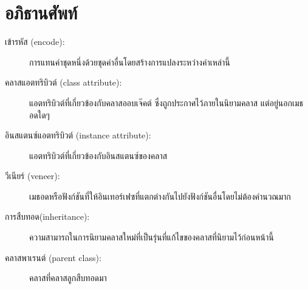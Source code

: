 \section{อภิธานศัพท์}

\begin{description}


\item[เข้ารหัส (encode):] การแทนค่าชุดหนึ่งด้วยชุดค่าอื่นโดยสร้างการแปลงระหว่างค่าเหล่านี้


\item[คลาสแอตทริบิวต์ (class attribute):] แอตทริบิวต์ที่เกี่ยวข้องกับคลาสออบเจ๊คต์ ซึ่งถูกประกาศไว้ภายในนิยามคลาส แต่อยู่นอกเมธอดใดๆ


\item[อินสแตนซ์แอตทริบิวต์ (instance attribute):] แอตทริบิวต์ที่เกี่ยวข้องกับอินสแตนซ์ของคลาส


\item[วีเนียร์ (veneer):] เมธอดหรือฟังก์ชันที่ให้อินเทอร์เฟซที่แตกต่างกันไปยังฟังก์ชันอื่นโดยไม่ต้องคำนวณมาก


\item[การสืบทอด(inheritance):] ความสามารถในการนิยามคลาสใหม่ที่เป็นรุ่นที่แก้ไขของคลาสที่นิยามไว้ก่อนหน้านี้ 


\item[คลาสพาเรนต์ (parent class):] คลาสที่คลาสลูกสืบทอดมา


\end{description}
